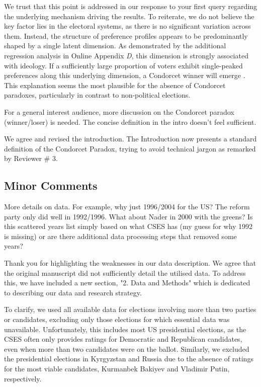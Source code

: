 \documentclass[a4paper, 12pt]{scrartcl}
\theoremstyle{break}
\newenvironment{changes}{\par\color{violet}\par\addvspace{\baselineskip}}{\par\addvspace{\baselineskip}}
\begin{document}
We trust that this point is addressed in our response to your first query regarding the underlying mechanism driving the results. To reiterate, we do not believe the key factor lies in the electoral systems, as there is no significant variation across them. Instead, the structure of preference profiles appears to be predominantly shaped by a single latent dimension. As demonstrated by the additional regression analysis in Online Appendix \textit{D}, this dimension is strongly associated with ideology. If a sufficiently large proportion of voters exhibit single-peaked preferences along this underlying dimension, a Condorcet winner will emerge \citep{Black1958}. This explanation seems the most plausible for the absence of Condorcet paradoxes, particularly in contrast to non-political elections.

\begin{changes}
For a general interest audience, more discussion on the Condorcet paradox (winner/loser) is needed. The concise definition in the intro doesn’t feel sufficient.
\end{changes}

We agree and revised the introduction. The Introduction now presents a standard definition of the Condorcet Paradox, trying to avoid technical jargon as remarked by Reviewer \# $3$.

\subsection*{Minor Comments}
\begin{changes}
More details on data. For example, why just 1996/2004 for the US? The reform party only did well in 1992/1996. What about Nader in 2000 with the greens? Is this scattered years list simply based on what CSES has (my guess for why 1992 is missing) or are there additional data processing steps that removed some years?
\end{changes}
Thank you for highlighting the weaknesses in our data description. We agree that the original manuscript did not sufficiently detail the utilised data. To address this, we have included a new section, "2. Data and Methods" which is dedicated to describing our data and research strategy. 

To clarify, we used all available data for elections involving more than two parties or candidates, excluding only those elections for which essential data was unavailable. Unfortunately, this includes most US presidential elections, as the CSES often only provides ratings for Democratic and Republican candidates, even when more than two candidates were on the ballot. Similarly, we excluded the presidential elections in Kyrgyzstan and Russia due to the absence of ratings for the most viable candidates, Kurmanbek Bakiyev and Vladimir Putin, respectively.
\end{document}

